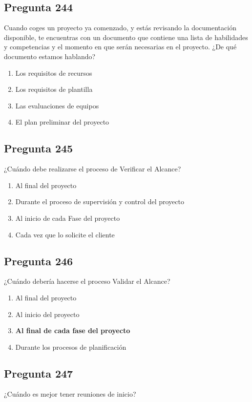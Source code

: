 \documentclass[11pt,a4paper]{article}
\begin{document}
\subsection*{Pregunta 244}
Cuando coges un proyecto ya comenzado, y estás revisando la documentación disponible, te encuentras con un documento que contiene una lista de habilidades y competencias y el momento en que serán necesarias en el proyecto. ¿De qué documento estamos hablando?

\begin{enumerate}[label=\alph*)]
  \item Los requisitos de recursos
  \item Los requisitos de plantilla
  \item Las evaluaciones de equipos
  \item El plan preliminar del proyecto
\end{enumerate}

\subsection*{Pregunta 245}
¿Cuándo debe realizarse el proceso de Verificar el Alcance?

\begin{enumerate}[label=\alph*)]
  \item Al final del proyecto
  \item Durante el proceso de supervisión y control del proyecto
  \item Al inicio de cada Fase del proyecto
  \item Cada vez que lo solicite el cliente
\end{enumerate}

\subsection*{Pregunta 246}
¿Cuándo debería hacerse el proceso Validar el Alcance?

\begin{enumerate}[label=\alph*)]
  \item Al final del proyecto
  \item Al inicio del proyecto
  \item \textbf{Al final de cada fase del proyecto}
  \item Durante los procesos de planificación
\end{enumerate}

\subsection*{Pregunta 247}
¿Cuándo es mejor tener reuniones de inicio?
\end{document}
